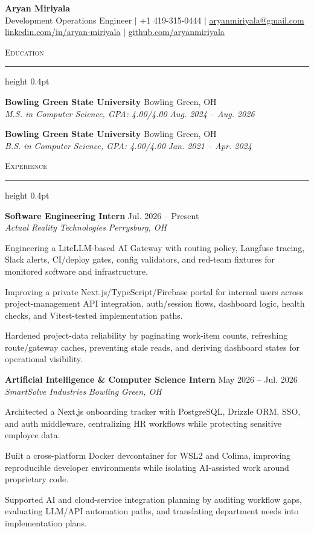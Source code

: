 \documentclass[letterpaper,11pt]{article}
\newcommand{\resumesection}[1]{%
  \par\vspace{2pt}%
  {\large\scshape #1}\par\vspace{2pt}%
  \hrule height 0.4pt\vspace{2pt}%
}
\newcommand{\resumeSubheading}[4]{
  \textbf{#1} \hfill #2\\
  \textit{#3} \hfill \textit{#4}
}
\begin{document}
\begin{center}
  {\LARGE \textbf{Aryan Miriyala}}\\[-1pt]
  \small
  Development Operations Engineer $|$
  +1 419-315-0444 $|$
  \href{mailto:aryanmiriyala@gmail.com}{aryanmiriyala@gmail.com}\\[-1pt]
  \href{https://www.linkedin.com/in/aryan-miriyala-7788a21b6/}{linkedin.com/in/aryan-miriyala} $|$
  \href{https://github.com/aryanmiriyala}{github.com/aryanmiriyala}
\end{center}\vspace{-10pt}

\resumesection{Education}
\resumeSubheading
{Bowling Green State University}{Bowling Green, OH}
{M.S. in Computer Science, GPA: 4.00/4.00}{Aug. 2024 -- Aug. 2026}

\resumeSubheading
{Bowling Green State University}{Bowling Green, OH}
{B.S. in Computer Science, GPA: 4.00/4.00}{Jan. 2021 -- Apr. 2024}

\resumesection{Experience}
\resumeSubheading
{Software Engineering Intern}{Jul. 2026 -- Present}
{Actual Reality Technologies}{Perrysburg, OH}
\begin{tightitemize}
  \item Engineering a LiteLLM-based AI Gateway with routing policy, Langfuse tracing, Slack alerts, CI/deploy gates, config validators, and red-team fixtures for monitored software and infrastructure.
  \item Improving a private Next.js/TypeScript/Firebase portal for internal users across project-management API integration, auth/session flows, dashboard logic, health checks, and Vitest-tested implementation paths.
  \item Hardened project-data reliability by paginating work-item counts, refreshing route/gateway caches, preventing stale reads, and deriving dashboard states for operational visibility.
\end{tightitemize}

\resumeSubheading
{Artificial Intelligence \& Computer Science Intern}{May 2026 -- Jul. 2026}
{SmartSolve Industries}{Bowling Green, OH}
\begin{tightitemize}
  \item Architected a Next.js onboarding tracker with PostgreSQL, Drizzle ORM, SSO, and auth middleware, centralizing HR workflows while protecting sensitive employee data.
  \item Built a cross-platform Docker devcontainer for WSL2 and Colima, improving reproducible developer environments while isolating AI-assisted work around proprietary code.
  \item Supported AI and cloud-service integration planning by auditing workflow gaps, evaluating LLM/API automation paths, and translating department needs into implementation plans.
\end{tightitemize}
\end{document}
